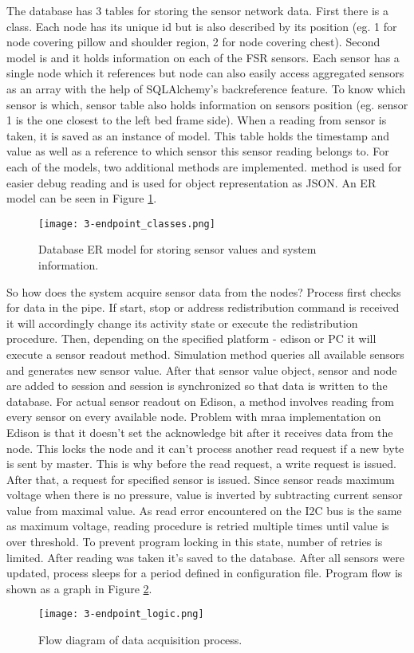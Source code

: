 The database has 3 tables for storing the sensor network data. First there is a  class. Each node has its unique \ac{id} but is also described by its position (eg. 1 for node covering pillow and shoulder region, 2 for node covering chest). Second model is  and it holds information on each of the \ac{FSR} sensors. Each sensor has a single node which it references but node can also easily access aggregated sensors as an array with the help of SQLAlchemy's backreference feature. To know which sensor is which, sensor table also holds information on sensors position (eg. sensor 1 is the one closest to the left bed frame side). When a reading from sensor is taken, it is saved as an instance of  model. This table holds the timestamp and value as well as a reference to which sensor this sensor reading belongs to. For each of the models, two additional methods are implemented.  method is used for easier debug reading and  is used for object representation as JSON. An \ac{ER} model can be seen in Figure \ref{fig:endpoint_classes}. \\

\begin{figure}[h]
  \begin{center}
    \texttt{[image: 3-endpoint\_classes.png]}
  \end{center}
  \caption{Database \ac{ER} model for storing sensor values and system information.}
  \label{fig:endpoint_classes}
\end{figure}

So how does the system acquire sensor data from the nodes? Process first checks for data in the pipe. If start, stop or address redistribution command is received it will accordingly change its activity state or execute the redistribution procedure. Then, depending on the specified platform - edison or \ac{PC} it will execute a sensor readout method. Simulation method queries all available sensors and generates new sensor value. After that sensor value object, sensor and node are added to session and session is synchronized so that data is written to the database. For actual sensor readout on Edison, a method involves reading from every sensor on every available node. Problem with mraa implementation on Edison is that it doesn't set the acknowledge bit after it receives data from the node. This locks the node and it can't process another read request if a new byte is sent by master. This is why before the read request, a write request is issued. After that, a request for specified sensor is issued. Since sensor reads maximum voltage when there is no pressure, value is inverted by subtracting current sensor value from maximal value. As read error encountered on the \ac{I2C} bus is the same as maximum voltage, reading procedure is retried multiple times until value is over threshold. To prevent program locking in this state, number of retries is limited. After reading was taken it's saved to the database. After all sensors were updated, process sleeps for a period defined in configuration file. Program flow is shown as a graph in Figure \ref{fig:endpoint_logic}.

\begin{figure}[h]
  \begin{center}
    \texttt{[image: 3-endpoint\_logic.png]}
  \end{center}
  \caption{Flow diagram of data acquisition process.}
  \label{fig:endpoint_logic}
\end{figure}